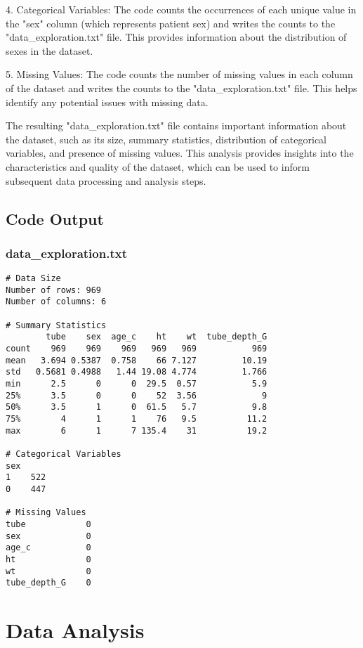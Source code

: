 \documentclass[11pt]{article}
\begin{document}
4. Categorical Variables: The code counts the occurrences of each unique value in the "sex" column (which represents patient sex) and writes the counts to the "data\_exploration.txt" file. This provides information about the distribution of sexes in the dataset.

5. Missing Values: The code counts the number of missing values in each column of the dataset and writes the counts to the "data\_exploration.txt" file. This helps identify any potential issues with missing data.

The resulting "data\_exploration.txt" file contains important information about the dataset, such as its size, summary statistics, distribution of categorical variables, and presence of missing values. This analysis provides insights into the characteristics and quality of the dataset, which can be used to inform subsequent data processing and analysis steps.

\subsection{Code Output}

\subsubsection*{data\_exploration.txt}

\begin{Verbatim}[tabsize=4]
# Data Size
Number of rows: 969
Number of columns: 6

# Summary Statistics
        tube    sex  age_c    ht    wt  tube_depth_G
count    969    969    969   969   969           969
mean   3.694 0.5387  0.758    66 7.127         10.19
std   0.5681 0.4988   1.44 19.08 4.774         1.766
min      2.5      0      0  29.5  0.57           5.9
25%      3.5      0      0    52  3.56             9
50%      3.5      1      0  61.5   5.7           9.8
75%        4      1      1    76   9.5          11.2
max        6      1      7 135.4    31          19.2

# Categorical Variables
sex
1    522
0    447

# Missing Values
tube            0
sex             0
age_c           0
ht              0
wt              0
tube_depth_G    0

\end{Verbatim}

\section{Data Analysis}
\end{document}
